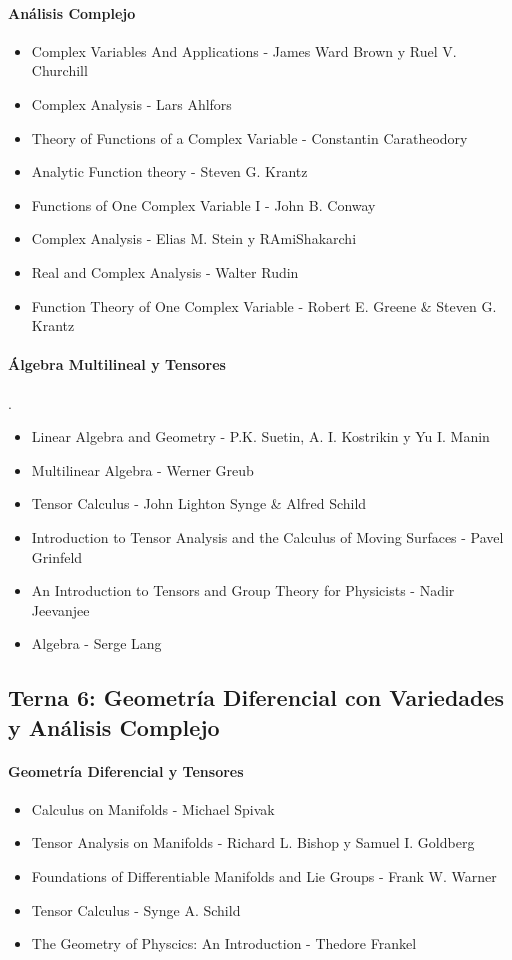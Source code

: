 \documentclass{article}
\begin{document}
\paragraph*{An\'alisis Complejo}
\begin{itemize}
	\item Complex Variables And Applications - James Ward Brown y Ruel V. Churchill
	\item Complex Analysis - Lars Ahlfors
	\item Theory of Functions of a Complex Variable - Constantin Caratheodory
	\item Analytic Function theory - Steven G. Krantz
	\item Functions of One Complex Variable I - John B. Conway
	\item Complex Analysis - Elias M. Stein y RAmiShakarchi
	\item Real and Complex Analysis - Walter Rudin
	\item Function Theory of One Complex Variable - Robert E. Greene & Steven G. Krantz
\end{itemize}
\paragraph*{\'Algebra Multilineal y Tensores}.
\begin{itemize}
	\item Linear Algebra and Geometry - P.K. Suetin, A. I. Kostrikin y Yu I. Manin
	\item Multilinear Algebra - Werner Greub
	\item Tensor Calculus - John Lighton Synge & Alfred Schild
	\item Introduction to Tensor Analysis and the Calculus of Moving Surfaces - Pavel Grinfeld
	\item An Introduction to Tensors and Group Theory for Physicists - Nadir Jeevanjee
	\item Algebra - Serge Lang
\end{itemize}
\subsection*{Terna 6: Geometr\'ia Diferencial con Variedades y An\'alisis Complejo}
\paragraph*{Geometr\'ia Diferencial y Tensores}
\begin{itemize}
	\item Calculus on Manifolds - Michael Spivak
	\item Tensor Analysis on Manifolds - Richard L. Bishop y Samuel I. Goldberg
	\item Foundations of Differentiable Manifolds and Lie Groups - Frank W. Warner
	\item Tensor Calculus - Synge A. Schild
	\item The Geometry of Physcics: An Introduction - Thedore Frankel
\end{itemize}
\end{document}
